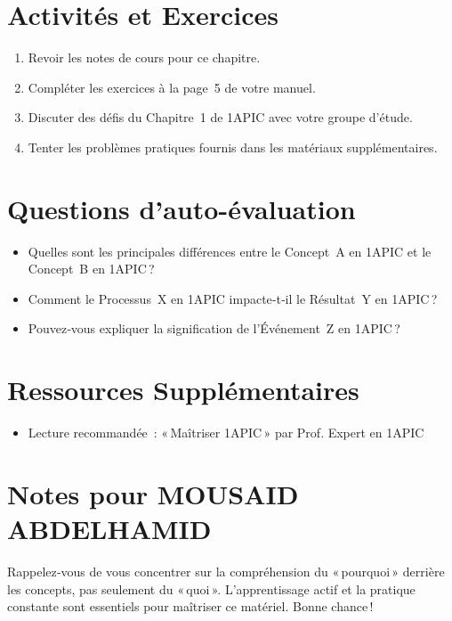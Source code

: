 \documentclass{article}
\begin{document}
	\section*{Activités et Exercices}
	\begin{enumerate}
		\item Revoir les notes de cours pour ce chapitre.
		\item Compléter les exercices à la page 5 de votre manuel.
		\item Discuter des défis du Chapitre 1 de 1APIC avec votre groupe d'étude.
		\item Tenter les problèmes pratiques fournis dans les matériaux supplémentaires.
	\end{enumerate}
	
	\section*{Questions d'auto-évaluation}
	\begin{itemize}
		\item Quelles sont les principales différences entre le Concept A en 1APIC et le Concept B en 1APIC ?
		\item Comment le Processus X en 1APIC impacte‑t‑il le Résultat Y en 1APIC ?
		\item Pouvez‑vous expliquer la signification de l'Événement Z en 1APIC ?
	\end{itemize}
	
	\section*{Ressources Supplémentaires}
	\begin{itemize}
		\item Lecture recommandée : « Maîtriser 1APIC » par Prof. Expert en 1APIC
	\end{itemize}
	
	\section*{Notes pour MOUSAID ABDELHAMID}
	Rappelez‑vous de vous concentrer sur la compréhension du « pourquoi »  
	derrière les concepts, pas seulement du « quoi ».  
	L'apprentissage actif et la pratique constante sont essentiels pour maîtriser ce matériel.  
	Bonne chance !
	
\end{document}
